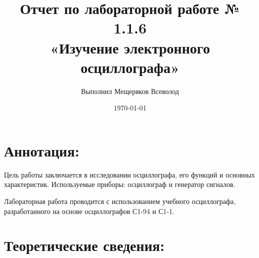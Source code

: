 \documentclass[a4paper,12pt]{report}
\author{Выполнил Мещеряков Всеволод}
\title{Отчет по лабораторной работе № 1.1.6\\[15pt] «Изучение электронного осциллографа»}
\date{\today}
\begin{document}
\maketitle
	
	\section{\Large Аннотация:}
	\text\par{	Цель работы заключается в исследовании осциллографа, его функций и основных характеристик. Используемые приборы: осциллограф и генератор сигналов.}
	\\
	\text\par{	Лабораторная работа проводится с использованием учебного осциллографа, разработанного на основе осциллографов С1-94 и С1-1.} 
	
	\section{\Large Теоретические сведения: }
\end{document}
